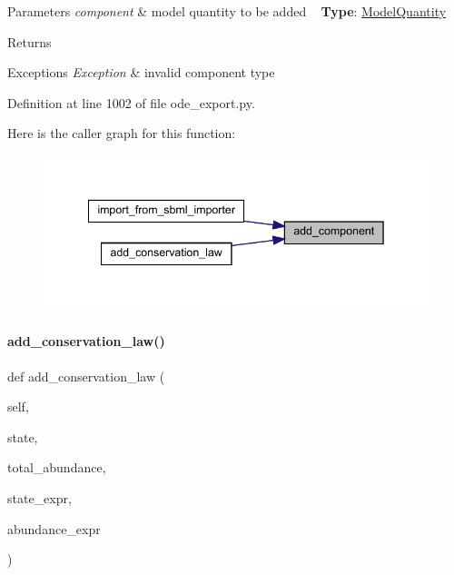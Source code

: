 \begin{DoxyParams}{Parameters}
{\em component} & model quantity to be added ~\newline
{\bfseries{Type}}\+: \mbox{\hyperlink{classamici_1_1ode__export_1_1_model_quantity}{Model\+Quantity}}\\
\hline
\end{DoxyParams}
\begin{DoxyReturn}{Returns}

\end{DoxyReturn}

\begin{DoxyExceptions}{Exceptions}
{\em Exception} & invalid component type \\
\hline
\end{DoxyExceptions}


Definition at line 1002 of file ode\+\_\+export.\+py.

Here is the caller graph for this function\+:
\nopagebreak
\begin{figure}[H]
\begin{center}
\leavevmode
\includegraphics[width=342pt]{classamici_1_1ode__export_1_1_o_d_e_model_a2731bd07d8e64b54d6b455d6d8441f13_icgraph}
\end{center}
\end{figure}
\mbox{\label{classamici_1_1ode__export_1_1_o_d_e_model_a0141f61903c375ed6867932c570f7e4f}} 
\paragraph{\texorpdfstring{add\_conservation\_law()}{add\_conservation\_law()}}
{\footnotesize\ttfamily def add\+\_\+conservation\+\_\+law (\begin{DoxyParamCaption}\item[{}]{self,  }\item[{}]{state,  }\item[{}]{total\+\_\+abundance,  }\item[{}]{state\+\_\+expr,  }\item[{}]{abundance\+\_\+expr }\end{DoxyParamCaption})}


